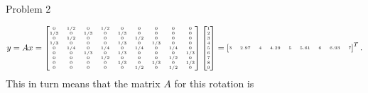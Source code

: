 \begin{problem}{Problem 2}
\begin{Highlight}
        \begin{equation}
            \tiny{
                y = Ax =
                \begin{bmatrix}
                    0 & 1/2 & 0 & 1/2 & 0 & 0 & 0 & 0 & 0 \\
                    1/3 & 0 & 1/3 & 0 & 1/3 & 0 & 0 & 0 & 0 \\
                    0 & 1/2 & 0 & 0 & 0 & 1/2 & 0 & 0 & 0 \\
                    1/3 & 0 & 0 & 0 & 1/3 & 0 & 1/3 & 0 & 0 \\
                    0 & 1/4 & 0 & 1/4 & 0 & 1/4 & 0 & 1/4 & 0 \\
                    0 & 0 & 1/3 & 0 & 1/3 & 0 & 0 & 0 & 1/3 \\
                    0 & 0 & 0 & 1/2 & 0 & 0 & 0 & 1/2 & 0 \\
                    0 & 0 & 0 & 0 & 1/3 & 0 & 1/3 & 0 & 1/3 \\
                    0 & 0 & 0 & 0 & 0 & 1/2 & 0 & 1/2 & 0 \\
                \end{bmatrix}
                \begin{bmatrix}
                    1 \\
                    2 \\
                    3 \\
                    4 \\
                    5 \\
                    6 \\
                    7 \\
                    8 \\
                    9 \\
                \end{bmatrix}
                = 
                \begin{bmatrix}
                    3 & 2.97 & 4 & 4.29 & 5 & 5.61 & 6 & 6.93 & 7 \\
                \end{bmatrix}^{T}.
            }
            \normalsize
        \end{equation}
        This in turn means that the matrix $A$ for this rotation is


\end{Highlight}
\end{problem}
